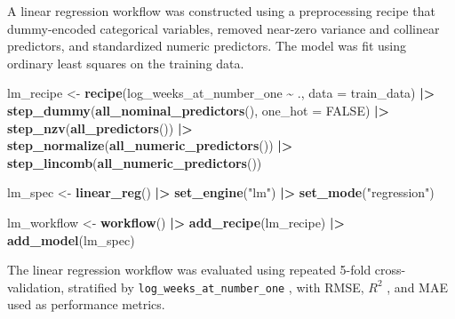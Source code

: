 \documentclass[
]{article}
\newenvironment{Shaded}{\begin{snugshade}}{\end{snugshade}}
\newcommand{\AttributeTok}[1]{\textcolor[rgb]{0.13,0.29,0.53}{#1}}
\newcommand{\ConstantTok}[1]{\textcolor[rgb]{0.56,0.35,0.01}{#1}}
\newcommand{\FunctionTok}[1]{\textcolor[rgb]{0.13,0.29,0.53}{\textbf{#1}}}
\newcommand{\NormalTok}[1]{#1}
\newcommand{\OtherTok}[1]{\textcolor[rgb]{0.56,0.35,0.01}{#1}}
\newcommand{\SpecialCharTok}[1]{\textcolor[rgb]{0.81,0.36,0.00}{\textbf{#1}}}
\newcommand{\StringTok}[1]{\textcolor[rgb]{0.31,0.60,0.02}{#1}}
\begin{document}
A linear regression workflow was constructed using a preprocessing
recipe that dummy-encoded categorical variables, removed near-zero
variance and collinear predictors, and standardized numeric predictors.
The model was fit using ordinary least squares on the training data.

\begin{Shaded}
\begin{Highlighting}[]
\NormalTok{lm\_recipe }\OtherTok{\textless{}{-}} \FunctionTok{recipe}\NormalTok{(log\_weeks\_at\_number\_one }\SpecialCharTok{\textasciitilde{}}\NormalTok{ ., }\AttributeTok{data =}\NormalTok{ train\_data) }\SpecialCharTok{|\textgreater{}}
  \FunctionTok{step\_dummy}\NormalTok{(}\FunctionTok{all\_nominal\_predictors}\NormalTok{(), }\AttributeTok{one\_hot =} \ConstantTok{FALSE}\NormalTok{) }\SpecialCharTok{|\textgreater{}}
  \FunctionTok{step\_nzv}\NormalTok{(}\FunctionTok{all\_predictors}\NormalTok{()) }\SpecialCharTok{|\textgreater{}}
  \FunctionTok{step\_normalize}\NormalTok{(}\FunctionTok{all\_numeric\_predictors}\NormalTok{()) }\SpecialCharTok{|\textgreater{}}
  \FunctionTok{step\_lincomb}\NormalTok{(}\FunctionTok{all\_numeric\_predictors}\NormalTok{())}

\NormalTok{lm\_spec }\OtherTok{\textless{}{-}} \FunctionTok{linear\_reg}\NormalTok{() }\SpecialCharTok{|\textgreater{}}
  \FunctionTok{set\_engine}\NormalTok{(}\StringTok{"lm"}\NormalTok{) }\SpecialCharTok{|\textgreater{}}
  \FunctionTok{set\_mode}\NormalTok{(}\StringTok{"regression"}\NormalTok{)}

\NormalTok{lm\_workflow }\OtherTok{\textless{}{-}} \FunctionTok{workflow}\NormalTok{() }\SpecialCharTok{|\textgreater{}}
  \FunctionTok{add\_recipe}\NormalTok{(lm\_recipe) }\SpecialCharTok{|\textgreater{}}
  \FunctionTok{add\_model}\NormalTok{(lm\_spec)}
\end{Highlighting}
\end{Shaded}

The linear regression workflow was evaluated using repeated 5-fold
cross-validation, stratified by \texttt{log\_weeks\_at\_number\_one} ,
with RMSE, \(R^2\) , and MAE used as performance metrics.
\end{document}
